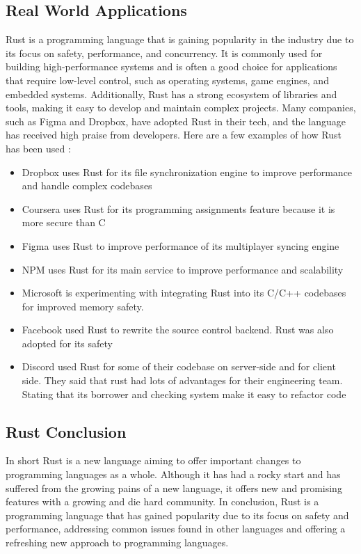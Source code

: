 \documentclass{article}
\theoremstyle{theorem}
\theoremstyle{definition}
\theoremstyle{remark}
\begin{document}
\subsection{Real World Applications}
Rust is a programming language that is gaining popularity in the industry due to its focus on safety, performance, and concurrency. It is commonly used for building high-performance systems and is often a good choice for applications that require low-level control, such as operating systems, game engines, and embedded systems. Additionally, Rust has a strong ecosystem of libraries and tools, making it easy to develop and maintain complex projects. Many companies, such as Figma and Dropbox, have adopted Rust in their tech, and the language has received high praise from developers. Here are a few examples of how Rust has been used \cite{9 Companies}:
\begin{itemize}
\item Dropbox uses Rust for its file synchronization engine to improve performance and handle complex codebases
\item Coursera uses Rust for its programming assignments feature because it is more secure than C
\item Figma uses Rust to improve performance of its multiplayer syncing engine
\item NPM uses Rust for its main service to improve performance and scalability
\item Microsoft is experimenting with integrating Rust into its C/C++ codebases for improved memory safety.
\item Facebook used Rust to rewrite the source control backend. Rust was also adopted for its safety
\item Discord used Rust for some of their codebase on server-side and for client side. They said that rust had lots of advantages for their engineering team. Stating that its borrower and checking system make it easy to refactor code
\end{itemize}
\subsection{Rust Conclusion}
In short Rust is a new language aiming to offer important changes to programming languages as a whole. Although it has had a rocky start and has suffered from the growing pains of a new language, it offers new and promising features with a growing and die hard community. In conclusion, Rust is a  programming language that has gained popularity due to its focus on safety and performance, addressing common issues found in other languages and offering a refreshing new approach to programming languages.
\end{document}
